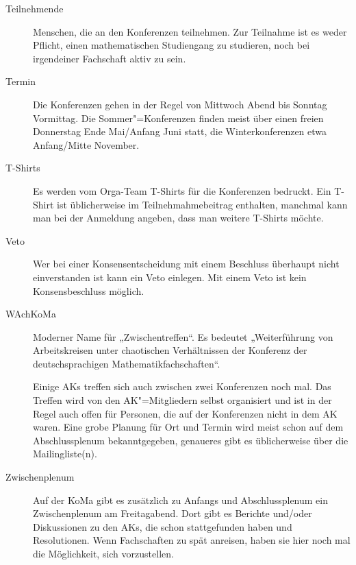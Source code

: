 \begin{description}
\item[Teilnehmende]
    Menschen, die an den Konferenzen teilnehmen. Zur Teilnahme ist es weder Pflicht, einen mathematischen Studiengang zu studieren, noch bei irgendeiner Fachschaft aktiv zu sein.

\item[Termin]
    Die Konferenzen gehen in der Regel von Mittwoch Abend bis Sonntag Vormittag. Die Sommer"=Konferenzen finden meist über einen freien Donnerstag Ende Mai/Anfang Juni statt, die Winterkonferenzen etwa Anfang/Mitte November.

\item[T-Shirts]
    Es werden vom Orga-Team T-Shirts für die Konferenzen bedruckt. Ein T-Shirt ist üblicherweise im Teilnehmahmebeitrag enthalten, manchmal kann man bei der Anmeldung angeben, dass man weitere T-Shirts möchte.

\item[Veto]
    Wer bei einer Konsensentscheidung mit einem Beschluss überhaupt nicht einverstanden ist kann ein Veto einlegen. Mit einem Veto ist kein Konsensbeschluss möglich.

\item[WAchKoMa]
    Moderner Name für „Zwischentreffen“. Es bedeutet „Weiterführung	von Arbeitskreisen unter chaotischen Verhältnissen der Konferenz der deutschsprachigen Mathematikfachschaften“. 
    
    Einige AKs treffen sich auch zwischen zwei Konferenzen noch mal. Das Treffen wird von den AK"=Mitgliedern selbst organisiert und ist in der Regel auch offen für Personen, die auf der Konferenzen nicht in dem AK waren.  Eine grobe Planung für Ort und Termin wird meist schon auf dem Abschlussplenum bekanntgegeben, genaueres gibt es üblicherweise über die Mailingliste(n).

\item[Zwischenplenum]
    Auf der KoMa gibt es zusätzlich zu Anfangs und Abschlussplenum ein Zwischenplenum am Freitagabend.  Dort gibt es Berichte und/oder Diskussionen zu den AKs, die schon stattgefunden haben und Resolutionen. Wenn Fachschaften zu spät anreisen, haben sie hier noch mal die Möglichkeit, sich vorzustellen.
\end{description}
